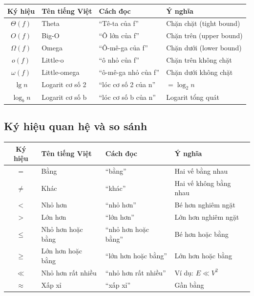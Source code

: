 \documentclass[10pt]{article}
\begin{document}
\begin{center}
\begin{tabular}{|c|l|l|l|}
\hline
\textbf{Ký hiệu} & \textbf{Tên tiếng Việt} & \textbf{Cách đọc} & \textbf{Ý nghĩa} \\
\hline
$\Theta(f)$ & Theta & ``Tê-ta của f'' & Chặn chặt (tight bound) \\
\hline
$O(f)$ & Big-O & ``Ô lớn của f'' & Chặn trên (upper bound) \\
\hline
$\Omega(f)$ & Omega & ``Ô-mê-ga của f'' & Chặn dưới (lower bound) \\
\hline
$o(f)$ & Little-o & ``ô nhỏ của f'' & Chặn trên không chặt \\
\hline
$\omega(f)$ & Little-omega & ``ô-mê-ga nhỏ của f'' & Chặn dưới không chặt \\
\hline
$\lg n$ & Logarit cơ số 2 & ``lóc cơ số 2 của n'' & $= \log_2 n$ \\
\hline
$\log_b n$ & Logarit cơ số b & ``lóc cơ số b của n'' & Logarit tổng quát \\
\hline
\end{tabular}
\end{center}

\subsection{Ký hiệu quan hệ và so sánh}

\begin{center}
\begin{tabular}{|c|l|l|l|}
\hline
\textbf{Ký hiệu} & \textbf{Tên tiếng Việt} & \textbf{Cách đọc} & \textbf{Ý nghĩa} \\
\hline
$=$ & Bằng & ``bằng'' & Hai vế bằng nhau \\
\hline
$\neq$ & Khác & ``khác'' & Hai vế không bằng nhau \\
\hline
$<$ & Nhỏ hơn & ``nhỏ hơn'' & Bé hơn nghiêm ngặt \\
\hline
$>$ & Lớn hơn & ``lớn hơn'' & Lớn hơn nghiêm ngặt \\
\hline
$\leq$ & Nhỏ hơn hoặc bằng & ``nhỏ hơn hoặc bằng'' & Bé hơn hoặc bằng \\
\hline
$\geq$ & Lớn hơn hoặc bằng & ``lớn hơn hoặc bằng'' & Lớn hơn hoặc bằng \\
\hline
$\ll$ & Nhỏ hơn rất nhiều & ``nhỏ hơn rất nhiều'' & Ví dụ: $E \ll V^2$ \\
\hline
$\approx$ & Xấp xỉ & ``xấp xỉ'' & Gần bằng \\
\hline
\end{tabular}
\end{center}
\end{document}
